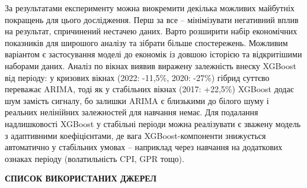 \documentclass{bachelor_thesis}
\begin{document}
За результатами експерименту можна виокремити декілька можливих майбутніх покращень для цього дослідження. Перш за все -- мінімізувати негативний вплив на результат, спричинений нестачею даних. Варто розширити набір економічних показників для широшого аналізу та зібрати більше спостережень. Можливим варіантом є застосування моделі до економік із довшою історією та відкритішими наборами даних. Аналіз по вікнах виявив виражену залежність внеску XGBoost від періоду: у кризових вікнах (2022: -11{,}5\%, 2020: -27\%) гібрид суттєво переважає ARIMA, тоді як у стабільних вікнах (2017: +22{,}5\%) XGBoost додає шум замість сигналу, бо залишки ARIMA є близькими до білого шуму і реальних нелінійних залежностей для навчання немає. Для подалання надлишковості XGBoost у стабільні періоди можна реалізувати є зважену модель з адаптивними коефіцієнтами, де вага XGBoost-компоненти знижується автоматично у стабільних умовах -- наприклад через навчання на додаткових ознаках періоду (волатильність CPI, GPR тощо).


\newpage
{}
\begin{center}
    {\bfseries\Large\MakeUppercase{Список використаних джерел}}
\end{center}

\vspace{12pt}
\end{document}
